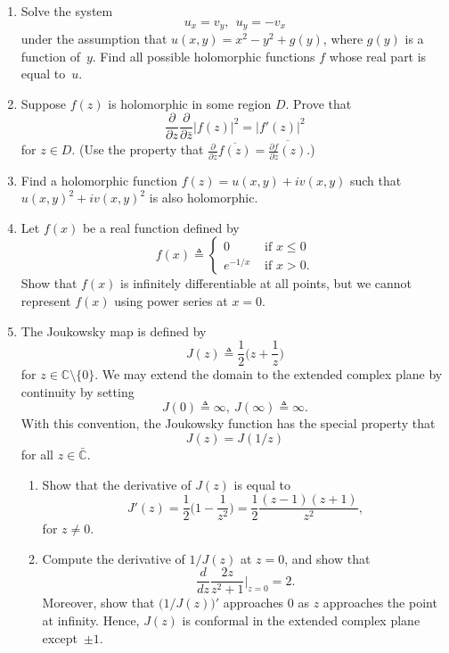 \begin{enumerate}
\item Solve the system
$$
u_x = v_y, \ \ u_y = -v_x
$$
under the assumption that $u(x,y) = x^2-y^2+g(y)$, where $g(y)$ is a function of~$y$. Find all possible holomorphic functions $f$ whose real part is equal to~$u$.

\item Suppose $f(z)$ is holomorphic in some region $D$. Prove that
$$
\frac{\partial}{\partial z} \frac{\partial}{\partial \bar{z} } |f(z)|^2
= |f'(z)|^2
$$
for $z\in D$. (Use the property that $\frac{\partial }{\partial \bar{z}} \overline{f(z)} =
\overline{\frac{\partial f}{\partial z}(z) }$.)

\item Find a holomorphic function $f(z)=u(x,y)+iv(x,y)$ such that
$u(x,y)^2 + i v(x,y)^2$ is also holomorphic.

\item Let $f(x)$ be a real function defined by
$$
f(x) \triangleq \begin{cases}
	0 & \text{ if } x\leq 0 \\
	e^{-1/x} & \text{ if } x >0.
\end{cases}
$$
Show that $f(x)$ is infinitely differentiable at all points, but we cannot represent $f(x)$ using power series at $x=0$.


\item The Joukowsky map is defined by
$$
J(z) \triangleq \frac{1}{2}\big(z + \frac{1}{z} \big)
$$
for $z \in \mathbb{C} \setminus\{0\}$.
We may extend the domain to the extended complex plane by continuity by setting
$$
J(0) \triangleq \infty, \ J(\infty) \triangleq \infty.
$$
With this convention, the Joukowsky function has the special property that 
$$
J(z) = J(1/z) 
$$
for all $z\in \bar{\mathbb{C}}$.

\begin{enumerate}
\item Show that the derivative of $J(z)$ is equal to
$$
J'(z) = \frac{1}{2}\big( 1 - \frac{1}{z^2}\big) = \frac{1}{2} \frac{(z-1)(z+1)}{z^2},
$$
for $z\neq 0$. 

\item Compute the derivative of $1/J(z)$ at $z=0$, and show that
$$
\frac{d}{dz} \frac{2z}{z^2+1} \Big|_{z=0}= 2.
$$
Moreover, show that $\big(1/J(z)\big)'$ approaches 0 as $z$ approaches the point at infinity.
Hence, $J(z)$ is conformal in the extended complex plane except~$\pm 1$.
\end{enumerate}


\end{enumerate}





